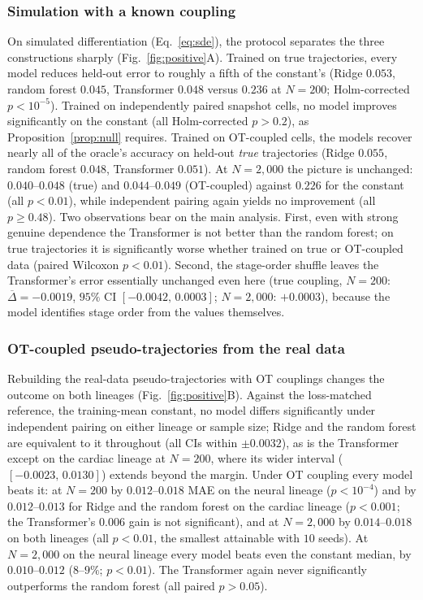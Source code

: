 \documentclass[10pt,journal,compsoc]{IEEEtran}
\begin{document}
\subsubsection{Simulation with a known coupling} On simulated differentiation (Eq.~\eqref{eq:sde}), the protocol separates the three constructions sharply (Fig.~\ref{fig:positive}A). Trained on true trajectories, every model reduces held-out error to roughly a fifth of the constant's (Ridge $0.053$, random forest $0.045$, Transformer $0.048$ versus $0.236$ at $N=200$; Holm-corrected $p<10^{-5}$). Trained on independently paired snapshot cells, no model improves significantly on the constant (all Holm-corrected $p>0.2$), as Proposition~\ref{prop:null} requires. Trained on OT-coupled cells, the models recover nearly all of the oracle's accuracy on held-out \emph{true} trajectories (Ridge $0.055$, random forest $0.048$, Transformer $0.051$). At $N=2{,}000$ the picture is unchanged: $0.040$--$0.048$ (true) and $0.044$--$0.049$ (OT-coupled) against $0.226$ for the constant (all $p<0.01$), while independent pairing again yields no improvement (all $p\ge0.48$). Two observations bear on the main analysis. First, even with strong genuine dependence the Transformer is not better than the random forest; on true trajectories it is significantly worse whether trained on true or OT-coupled data (paired Wilcoxon $p<0.01$). Second, the stage-order shuffle leaves the Transformer's error essentially unchanged even here (true coupling, $N=200$: $\overline{\Delta}=-0.0019$, $95\%$ CI $[-0.0042,\,0.0003]$; $N=2{,}000$: $+0.0003$), because the model identifies stage order from the values themselves.

\subsubsection{OT-coupled pseudo-trajectories from the real data} Rebuilding the real-data pseudo-trajectories with OT couplings changes the outcome on both lineages (Fig.~\ref{fig:positive}B). Against the loss-matched reference, the training-mean constant, no model differs significantly under independent pairing on either lineage or sample size; Ridge and the random forest are equivalent to it throughout (all CIs within $\pm0.0032$), as is the Transformer except on the cardiac lineage at $N=200$, where its wider interval ($[-0.0023,\,0.0130]$) extends beyond the margin. Under OT coupling every model beats it: at $N=200$ by $0.012$--$0.018$ MAE on the neural lineage ($p<10^{-4}$) and by $0.012$--$0.013$ for Ridge and the random forest on the cardiac lineage ($p<0.001$; the Transformer's $0.006$ gain is not significant), and at $N=2{,}000$ by $0.014$--$0.018$ on both lineages (all $p<0.01$, the smallest attainable with $10$ seeds). At $N=2{,}000$ on the neural lineage every model beats even the constant median, by $0.010$--$0.012$ ($8$--$9\%$; $p<0.01$). The Transformer again never significantly outperforms the random forest (all paired $p>0.05$).
\end{document}
